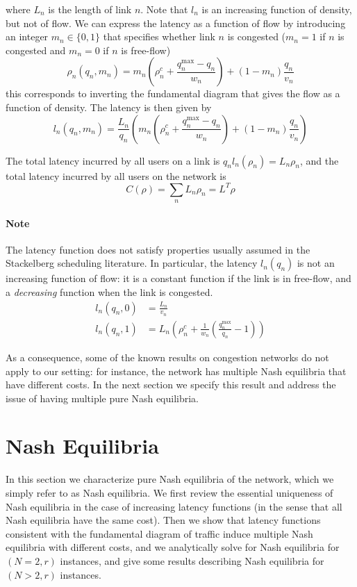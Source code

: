 where $L_n$ is the length of link $n$.
Note that $l_n$ is an increasing function of density, but not of flow. We can express the latency as a function of flow by introducing an integer $m_n \in \{0, 1\}$ that specifies whether link $n$ is congested ($m_n = 1$ if $n$ is congested and $m_n = 0$ if $n$ is free-flow)
\[
\rho_n(q_n, m_n) = m_n \left( \rho_n^c + \frac{q_n^{\max} - q_n}{w_n} \right) + (1-m_n)\frac{q_n}{v_n}
\]
this corresponds to inverting the fundamental diagram that gives the flow as a function of density. The latency is then given by
\[
l_n(q_n, m_n) = \frac{L_n}{q_n} \left( m_n \left( \rho_n^c + \frac{q_n^{\max} - q_n}{w_n} \right) + (1-m_n)\frac{q_n}{v_n} \right)
\]

The total latency incurred by all users on a link is $q_n l_n(\rho_n) = L_n \rho_n$, and the total latency incurred by all users on the network is
\[
C(\rho) = \sum_n L_n \rho_n = L^T\rho
\]

\paragraph{Note} The latency function does not satisfy properties usually assumed in the Stackelberg scheduling literature. In particular, the latency $l_n(q_n)$ is not an increasing function of flow: it is a constant function if the link is in free-flow, and a \emph{decreasing} function when the link is congested.
\begin{align*}
l_n(q_n, 0) &= \frac{L_n}{v_n}\\
l_n(q_n, 1) &= L_n \left( \rho_n^c + \frac{1}{w_n}(\frac{q_n^{\max}}{q_n} - 1) \right)
\end{align*}

As a consequence, some of the known results on congestion networks do not apply to our setting: for instance, the network has multiple Nash equilibria that have different costs. In the next section we specify this result and address the issue of having multiple pure Nash equilibria.



\section{Nash Equilibria}
In this section we characterize pure Nash equilibria of the network, which we simply refer to as Nash equilibria. We first review the essential uniqueness of Nash equilibria in the case of increasing latency functions (in the sense that all Nash equilibria have the same cost). Then we show that latency functions consistent with the fundamental diagram of traffic induce multiple Nash equilibria with different costs, and we analytically solve for Nash equilibria for $(N = 2, r)$ instances, and give some results describing Nash equilibria for $(N>2, r)$ instances.

